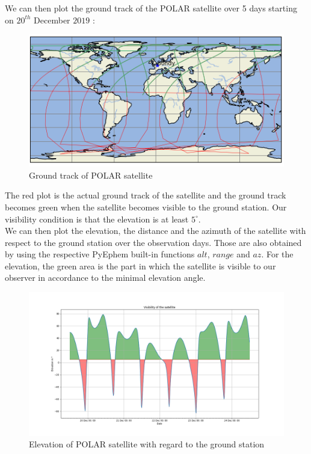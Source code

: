 \documentclass[a4paper,12pt,calibri,oneside,openany]{book}
\theoremstyle{break}
\begin{document}
\newpage
We can then plot the ground track of the POLAR satellite over 5 days starting on $20^{th}$ December $2019$ :

\begin{figure}[H]
	\centering
	\includegraphics[width=\linewidth]{groundtrack}
	\caption{Ground track of POLAR satellite}
\end{figure}

The red plot is the actual ground track of the satellite and the ground track becomes green when the satellite becomes visible to the ground station. Our visibility condition is that the elevation is at least $5^\circ$.\\

We can then plot the elevation, the distance and the azimuth of the satellite with respect to the ground station over the observation days. Those are also obtained by using the respective PyEphem built-in functions $alt$, $range$ and $az$. For the elevation, the green area is the part in which the satellite is visible to our observer in accordance to the minimal elevation angle.

\begin{figure}[H]
	\centering
	\includegraphics[width=\linewidth]{elevation}
	\caption{Elevation of POLAR satellite with regard to the ground station}
\end{figure}
\end{document}

